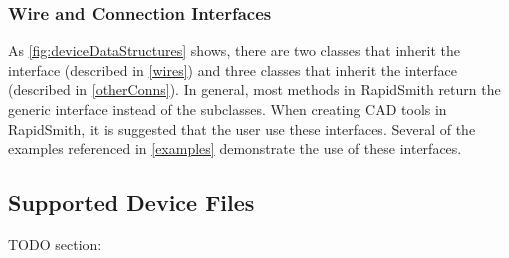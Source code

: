 \subsubsection{Wire and Connection Interfaces}
As \autoref{fig:deviceDataStructures} shows, there are two classes that
inherit the  interface (described in \autoref{wires}) and
three classes that inherit the  interface (described in 
\autoref{otherConns}). In general, most methods in RapidSmith return the
generic interface instead of the subclasses. When creating CAD tools in
RapidSmith, it is suggested that the user use these interfaces. Several of the
examples referenced in \autoref{examples} demonstrate the use of these
interfaces.

\subsection{Supported Device Files}
TODO section:
